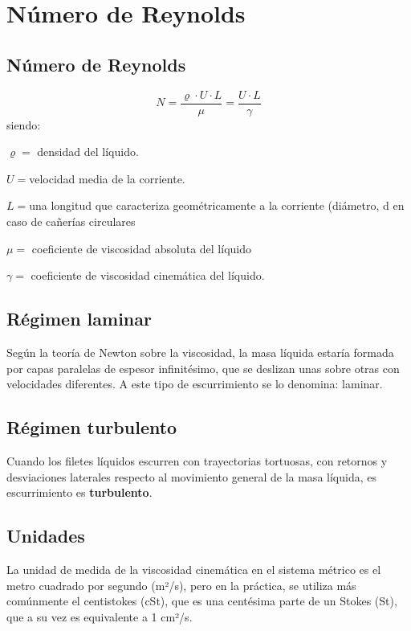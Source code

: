 \documentclass[../main]{subfiles}
\begin{document}
\chapter{Número de Reynolds}

\section{Número de Reynolds}
\begin{equation}
N=\dfrac{\varrho \cdot U \cdot L}{\mu}=\dfrac{U\cdot L}{\gamma}
\end{equation}
siendo:

$\varrho=$ densidad del líquido.

$U=$velocidad media de la corriente.

$L=$una longitud que caracteriza geométricamente a la corriente (diámetro, d en caso de cañerías circulares

$\mu =$ coeficiente de viscosidad absoluta del líquido

$\gamma=$ coeficiente de viscosidad cinemática del líquido. 

\section{Régimen laminar}
Según la teoría de Newton sobre la viscosidad, la masa líquida estaría formada por capas paralelas de espesor infinitésimo, que se deslizan unas sobre otras con velocidades diferentes. A este tipo de escurrimiento se lo denomina: laminar.
\section {Régimen turbulento}
Cuando los filetes líquidos escurren con trayectorias tortuosas, con retornos y desviaciones laterales respecto al movimiento general de la masa líquida, es escurrimiento 
es \textbf{turbulento}.

\section{Unidades}

La unidad de medida de la viscosidad cinemática en el sistema métrico es el metro cuadrado por segundo (m²/s), pero en la práctica, se utiliza más comúnmente el centistokes (cSt), que es una centésima parte de un Stokes (St), que a su vez es equivalente a 1 cm²/s.
\end{document}
